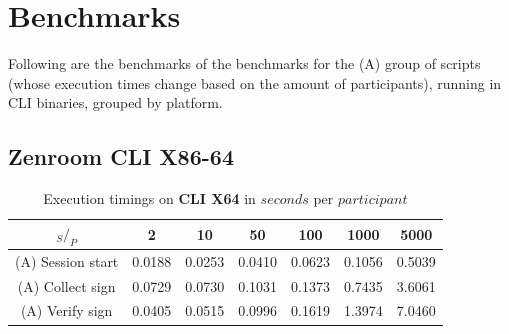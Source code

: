 \documentclass[twocolumn]{article}
\begin{document}


\onecolumn

\section{Benchmarks}
\label{sec:benchmarks}

Following are the benchmarks of the benchmarks for the (A) group of scripts (whose execution times change based on the amount of participants), running in CLI binaries, grouped by platform.


\subsection*{Zenroom CLI X86-64}


\begin{table}[h!]
  \begin{center}
    \caption{Execution timings on \textbf{CLI X64} in $seconds$ per $participant$}
      \label{tab:table1}
        \begin{tabular} {c|c|c|c|c|c|c}
          \toprule
           \textbf{$_S / _P$} & \textbf{2} & \textbf{10} & \textbf{50} & \textbf{100} & \textbf{1000} & \textbf{5000} \\
          \midrule
          (A) Session start & 0.0188 & 0.0253 & 0.0410 & 0.0623 & 0.1056 & 0.5039 \\
          (A) Collect sign & 0.0729 & 0.0730 & 0.1031 & 0.1373 & 0.7435 & 3.6061 \\
          (A) Verify sign & 0.0405 & 0.0515 & 0.0996 & 0.1619 & 1.3974 & 7.0460 \\
      \bottomrule %
    \end{tabular}
  \end{center}
\end{table}
\end{document}
